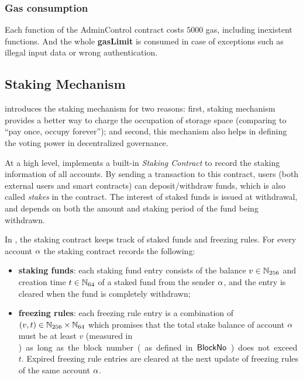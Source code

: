 \subsubsection{Gas consumption}

Each function of the AdminControl contract costs $5000$ gas,
including inexistent functions. 
And the whole {\bf gasLimit} is consumed in case of exceptions such as illegal input data or wrong authentication.

\subsection{Staking Mechanism}
\label{sec:staking}

\name introduces the staking mechanism for two reasons:
first, staking mechanism provides a better way to charge the occupation of storage space (comparing to ``pay once, occupy forever'');
and second, this mechanism also helps in defining the voting power in decentralized governance.

At a high level, \name implements a built-in \emph{Staking Contract} 
to record the staking information of all accounts.
By sending a transaction to this contract, 
users (both external users and smart contracts) can deposit/withdraw funds, which is also called \emph{stakes} in the contract.
The interest of staked funds is issued at withdrawal, 
and depends on both the amount and staking period of the fund being withdrawn. 



In \name, the staking contract keeps track of staked funds and freezing rules. For every account $\mathbf{\alpha}$ the staking contract records the following:
\begin{itemize}
	\item {\bf staking funds}: each staking fund entry consists of the balance $v\in\mathbb{N}_{256}$ and creation time $t\in\mathbb{N}_{64}$ of a staked fund from the sender $\mathbf{\alpha}$, and the entry is cleared when the fund is completely withdrawn;
	

	\item {\bf freezing rules}: each freezing rule entry is a combination of $(v,t)\in \mathbb{N}_{256}\times\mathbb{N}_{64}$ which promises that the total stake balance of account $\mathbf{\alpha}$ must be at least $v$ (measured in \unit) as long as the block number (as defined in \hyperlink{blockno}{$\mathsf{BlockNo}$}) does not exceed $t$. 
	Expired freezing rule entries are cleared at the next update of freezing rules of the same account $\mathbf{\alpha}$.	
\end{itemize}

